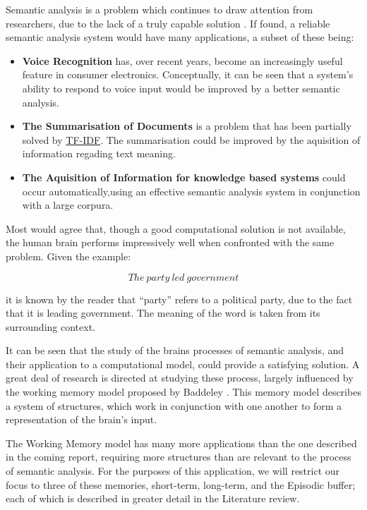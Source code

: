 \documentclass[]{article}
\begin{document}
Semantic analysis is a problem which continues to draw attention from researchers, due to the lack of a truly capable solution \cite{NLPHandbook}. If found, a reliable semantic analysis system would have many applications, a subset of these being:

\begin{itemize}
	\item \textbf{Voice Recognition} has, over recent years, become an increasingly useful feature in consumer electronics. Conceptually, it can be seen that a system's ability to respond to voice input would be improved by a better semantic analysis.
	
	\item \textbf{The Summarisation of Documents} is a problem that has been partially solved by \hyperref[sec:TFIDF]{TF-IDF}. The summarisation could be improved by the aquisition of information regading text meaning.
	 
	\item \textbf{The Aquisition of Information for knowledge based systems} could occur automatically,using an effective semantic analysis system in conjunction with a large corpura.
\end{itemize}

Most would agree that, though a good computational solution is not available, the human brain performs impressively well when confronted with the same problem. Given the example:

\[The\: party\: led\: government\]

it is known by the reader that “party” refers to a political party, due to the fact that it is leading government. The meaning of the word is taken from its surrounding context.

It can be seen that the study of the brains processes of semantic analysis, and their application to a computational model, could provide a satisfying solution. A great deal of research is directed at studying these process, largely influenced by the working memory model proposed by Baddeley \cite{MemoryBaddeleyEysenkAnderson}. This memory model describes a system of structures, which work in conjunction with one another to form a representation of the brain’s input. 

The Working Memory model has many more applications than the one described in the coming report, requiring more structures than are relevant to the process of semantic analysis. For the purposes of this application, we will restrict our focus to three of these memories, short-term, long-term, and the Episodic buffer\cite{MemoryBaddeleyEysenkAnderson}; each of which is described in greater detail in the Literature review.
\end{document}
